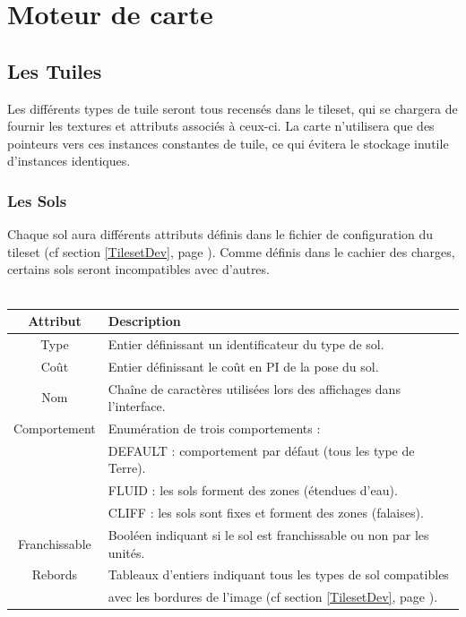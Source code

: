 \documentclass[a4paper]{article}
\newcommand{\alinea}{\hspace*{0.5cm}}
\begin{document}
	\section{Moteur de carte}
      \subsection{Les Tuiles}
        \alinea Les différents types de tuile seront tous recensés dans le tileset, qui se chargera de fournir les textures et attributs associés à ceux-ci. La carte n'utilisera que des pointeurs vers ces instances constantes de tuile, ce  qui évitera le stockage inutile d'instances identiques.
        
        \subsubsection{Les Sols}
          \alinea Chaque sol aura différents attributs définis dans le fichier de configuration du tileset (cf section \ref{TilesetDev}, page \pageref{TilesetDev}). Comme définis dans le cachier des charges, certains sols seront incompatibles avec d'autres.\\
          \\
	  	  \begin{small}
			\begin{tabular}{| c | l |}
			  \hline
			  \textbf{Attribut} & \textbf{Description}\\
			  \hline
			  Type & Entier définissant un identificateur du type de sol.\\
			  \hline
			  Coût & Entier définissant le coût en PI de la pose du sol.\\
			  \hline
			  Nom & Chaîne de caractères utilisées lors des affichages dans l'interface.\\
			  \hline
			  Comportement & Enumération de trois comportements :\\
			  & DEFAULT : comportement par défaut (tous les type de Terre).\\
			  & FLUID : les sols forment des zones (étendues d'eau).\\
			  & CLIFF : les sols sont fixes et forment des zones (falaises).\\
			  \hline
			  Franchissable & Booléen indiquant si le sol est franchissable ou non par les unités.\\
			  \hline
			  Rebords & Tableaux d'entiers indiquant tous les types de sol compatibles\\
			  & avec les bordures de l'image (cf  section \ref{TilesetDev}, page \pageref{TilesetDev}).\\
			  \hline
			\end{tabular}
		  \end{small}
          
\end{document}
